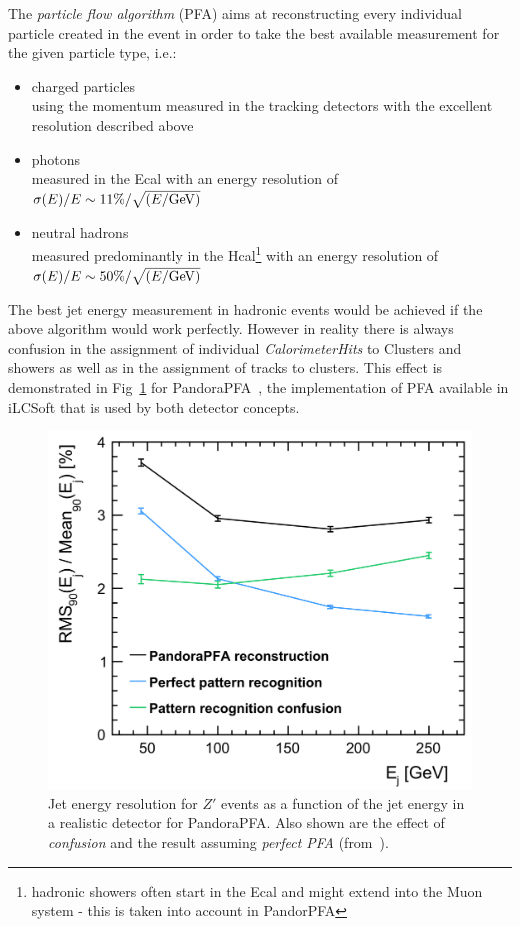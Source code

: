 The \emph{particle flow algorithm} (PFA) aims at reconstructing every individual particle created in the event in order
to take the best available measurement for the given particle type, i.e.:
\begin{itemize}
\item charged particles\\
  using the momentum measured in the tracking detectors with the excellent resolution described  above
\item photons\\
  measured in the Ecal with an energy resolution of $\sigma(E)/E \sim  11\% / \sqrt{(E/\rm{GeV})}$ 
\item neutral hadrons\\
  measured predominantly in the Hcal\footnote{hadronic showers often start in the Ecal and might extend into the Muon system -
    this is taken into account in PandorPFA} with an energy resolution of $\sigma(E)/E \sim  50\% / \sqrt{(E/\rm{GeV})}$  
\end{itemize}

The best jet energy measurement in hadronic events would be achieved if the above algorithm would work perfectly. However in reality
there is always confusion in the assignment of individual \emph{CalorimeterHits} to Clusters and showers as well as in the assignment
of tracks to clusters. This effect is demonstrated in Fig~\ref{fig:pandorapfa_perfect} for PandoraPFA~\cite{Marshall:2015rfa}, the
implementation of PFA available in iLCSoft that is used by both detector concepts.

\begin{figure}
\begin{center}
\includegraphics[width=0.85\hsize]{chapters/figures/pandorapfa_perfect.png}
\end{center}
\caption{Jet energy resolution for $Z'$ events as a function of the jet energy in a realistic detector for PandoraPFA.
  Also shown are the effect of \emph{confusion} and the result assuming \emph{perfect PFA} (from~\cite{Marshall:2015rfa}).} 
\label{fig:pandorapfa_perfect}
\end{figure}

